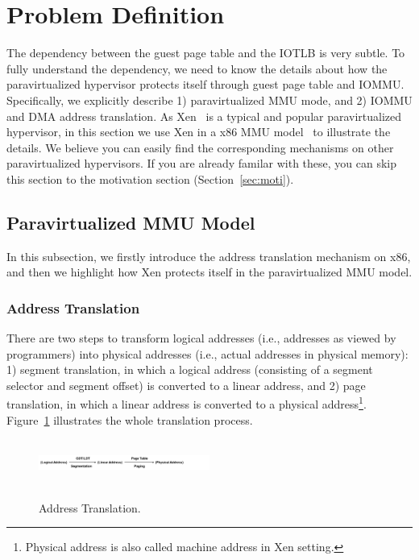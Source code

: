 \section{Problem Definition} \label{sec:prob}

The dependency between the guest page table and the IOTLB is very subtle.
To fully understand the dependency, we need to know the details about how the paravirtualized hypervisor protects itself through guest page table and IOMMU.
Specifically, we explicitly describe 1) paravirtualized MMU mode, and 2) IOMMU and DMA address translation.
As Xen~\cite{XEN-SOSP03} is a typical and popular paravirtualized hypervisor, in this section we use Xen in a x86 MMU model~\cite{x86-pv-model} to illustrate the details. We believe you can easily find the corresponding mechanisms on other paravirtualized hypervisors.
If you are already familar with these, you can skip this section to the motivation section (Section~\ref{sec:moti}).



\subsection{Paravirtualized MMU Model}\label{sec:pvmodel}
In this subsection, we firstly introduce the address translation mechanism on x86, and then we highlight how Xen protects itself in the paravirtualized MMU model.

\subsubsection{Address Translation}\label{sec:addr-trans}
There are two steps to transform logical addresses (i.e., addresses as viewed by programmers) into physical addresses (i.e., actual addresses in physical memory):
1) segment translation, in which a logical address (consisting of a segment selector and segment offset) is converted to a linear address,
and 2) page translation, in which a linear address is converted to a physical address\footnote{Physical address is also called machine address in Xen setting.}.
Figure~\ref{fig:address-translation} illustrates the whole translation process.
\begin{figure}[ht]
\centering
\includegraphics[height=1.5cm, width=0.5\textwidth]{image/background/address-translation.png} \\
\caption{Address Translation.}
\label{fig:address-translation}
\end{figure}



